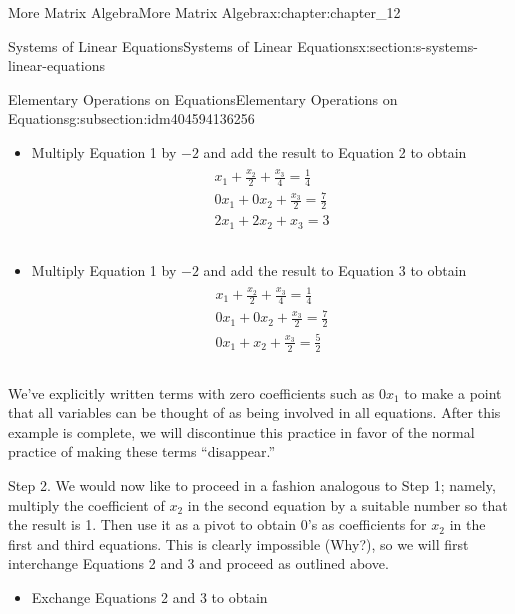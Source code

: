 \documentclass[twoside,10pt,]{book}
\numberwithin{equation}{section}
\begin{document}
\begin{chapterptx}{More Matrix Algebra}{}{More Matrix Algebra}{}{}{x:chapter:chapter_12}
\begin{sectionptx}{Systems of Linear Equations}{}{Systems of Linear Equations}{}{}{x:section:s-systems-linear-equations}
\begin{subsectionptx}{Elementary Operations on Equations}{}{Elementary Operations on Equations}{}{}{g:subsection:idm404594136256}
\begin{itemize}[label=\textbullet]
\begin{gather}
\begin{array}{c}
2 x_1+2 x_2+x_3=3\\\\
\end{array}\label{g:mrow:idm404594124512}
\end{gather}
%
\item{}Multiply Equation 1 by \(-2\) and  add the result to Equation 2 to obtain%
\begin{gather}
\begin{array}{c}
x_1+\frac{x_2}{2}+\frac{x_3}{4}=\frac{1}{4} \\
0 x_1 + 0 x_2+ \frac{x_3}{2}=\frac{7}{2} \\
2 x_1+2 x_2+x_3=3 \\\\
\end{array}\label{g:mrow:idm404594122976}
\end{gather}
%
\item{}Multiply Equation 1 by \(-2\) and  add the result to Equation 3 to obtain%
\begin{gather}
\begin{array}{c}
x_1+\frac{x_2}{2}+\frac{x_3}{4}=\frac{1}{4} \\
0 x_1 + 0 x_2+ \frac{x_3}{2}=\frac{7}{2} \\
0 x_1+ x_2+ \frac{x_3}{2}=\frac{5}{2} \\\\
\end{array}\label{g:mrow:idm404594121376}
\end{gather}
%
\end{itemize}
%
\par
We've explicitly written terms with zero coefficients such as \(0 x_1\) to make a point that all variables can be thought of as being involved in all equations.  After this example is complete, we will discontinue this practice in favor of the normal practice of making these terms ``disappear.''%
\par
Step 2. We would now like to proceed in a fashion analogous to Step 1; namely, multiply the coefficient of \(x_2\) in the second equation by a suitable number so that the result is 1. Then use it as a pivot to obtain 0's as coefficients for \(x_2\) in the first and third equations. This is clearly impossible (Why?), so we will first interchange Equations 2 and 3 and proceed as outlined above.%
\begin{itemize}[label=\textbullet]
\item{}Exchange Equations 2 and 3 to obtain%
\begin{gather}

\end{gather}
\end{itemize}
\end{subsectionptx}
\end{sectionptx}
\end{chapterptx}
\end{document}
